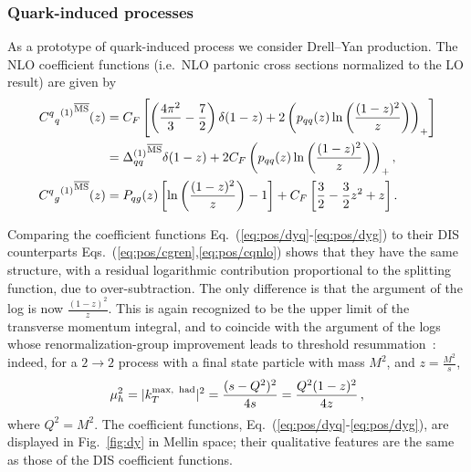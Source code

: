 \subsubsection{Quark-induced processes}
\label{sec:dy}
As a prototype of quark-induced process we consider Drell--Yan
production. The NLO coefficient functions (i.e.\ NLO partonic
cross sections normalized to the LO result) are given by 
\begin{align}\label{eq:pos/dyq}
 {{C^q{}_q}^{(1)}}^{{\overline{\textrm{MS}}}}(z)&= C_F\left[
 \left(\frac{4\pi^2}{3} - \frac 7 2\right)\delta(1-z) + 2
 \left(p_{qq}(z) \ln\left(\frac{(1-z)^2}{z}\right)
 \right)_+\right]\nonumber  \\
 &={\Delta_{qq}^{(1)}}^{{\overline{\textrm{MS}}}}\delta(1-z) + 2 C_F \left(p_{qq}(z) \ln\left(\frac{(1-z)^2}{z}\right) \right)_+,\\
 \label{eq:pos/dyg}
  {{C^q{}_g}^{(1)}}^{{\overline{\textrm{MS}}}}(z)&= P_{qg}(z) \left[ \ln\left(\frac{(1-z)^2}{z}\right) - 1 \right]
  + C_F\left[\frac 3 2 -  \frac 3 2 z^2 + z\right].
\end{align}


Comparing the coefficient functions
Eq.~(\ref{eq:pos/dyq}-\ref{eq:pos/dyg}) to their DIS counterparts
Eqs.~(\ref{eq:pos/cgren},\ref{eq:pos/cqnlo}) shows that they have the same
structure, with a residual logarithmic contribution proportional to
the splitting function, due to over-subtraction. The only difference is
that the argument of the log is now $\frac{(1-z)^2}{z}$. This is again
recognized to be the upper limit of the transverse momentum integral,
and to coincide with the argument of the logs whose
renormalization-group improvement leads to threshold
resummation~\cite{Forte:2002ni}: indeed,
for a $2\to2$ process with a final state particle with mass $M^2$, and
$z=\frac{M^2}{s}$,
\begin{equation}\label{eq:pos/ktmaxh}
\mu_h^2=  |k_T^{\textrm{max,\, had}}|^2=\frac{(s-Q^2)^2}{4s}=\frac{Q^2(1-z)^2}{4z}\,,
\end{equation}
where $ Q^2 = M^2 $.
The coefficient
functions, Eq.~(\ref{eq:pos/dyq}-\ref{eq:pos/dyg}), are displayed in
Fig.~\ref{fig:dy} in Mellin space; their qualitative features are the
same as those of the DIS coefficient functions.

